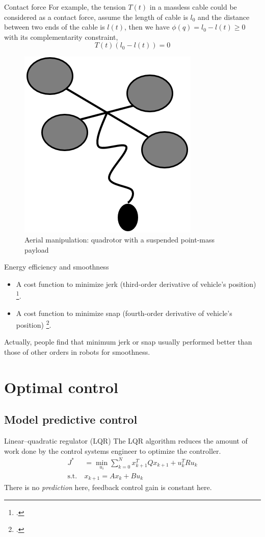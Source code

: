 \documentclass{beamer}
\begin{document}
\begin{frame}{Contact force}
	For example, the tension $T(t)$ in a massless cable could be considered as a contact force, assume the length of cable is $l_0$ and the distance between two ends of the cable is $l(t)$, then we have $\phi(q) = l_0 - l(t) \geq 0$ with its complementarity constraint,
	\begin{equation*}
	T(t) (l_0 - l(t)) = 0
	\end{equation*}
	\begin{figure}
		\includegraphics[width=0.2\linewidth]{figures/aerial-manipulation.png}
		\caption{Aerial manipulation: quadrotor with a suspended point-mass payload}
	\end{figure}
\end{frame}

\begin{frame}{Energy efficiency and smoothness}
	\begin{itemize}
		\item A cost function to minimize jerk (third-order derivative of vehicle's position) \footcite{pattacini2010experimental}.
		\item A cost function to minimize snap (fourth-order derivative of vehicle's position) \footcite{mellinger2011minimum}.
	\end{itemize}

	Actually, people find that minimum jerk or snap usually performed better than those of other orders in robots for smoothness. 
\end{frame}

\section{Optimal control}
\subsection{Model predictive control}
\begin{frame}{Linear–quadratic regulator (LQR)}
	The LQR algorithm reduces the amount of work done by the control systems engineer to optimize the controller.
	\begin{align*}
		J^* &= \min_{u_i} \sum_{k = 0}^{N} x_{k+1}^T Q x_{k+1} + u_k^T R u_k \\
		\text{s.t.} \ & x_{k+1} = A x_{k} + B u_{k}
	\end{align*}
	There is no \emph{prediction} here, feedback control gain is constant here.
\end{frame}
\end{document}
